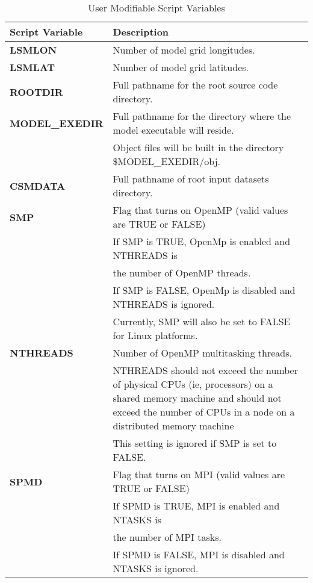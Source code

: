 \bigskip
\begin{longtable}{|p{1.5in}|p{4.5in}|}
\caption{\label{table_env_vars} User Modifiable Script Variables} \\
\hline
\endhead
\hline
{\bf Script Variable} & {\bf Description}  \\ \hline \hline
{\bf LSMLON}         &   Number of model grid longitudes. \\ \hline
{\bf LSMLAT}         &   Number of model grid latitudes. \\ \hline
{\bf ROOTDIR}        &   Full pathname for the root source code directory. \\ \hline
{\bf MODEL\_EXEDIR}  &   Full pathname for the directory where the model executable will reside. \\
                     &   Object files will be built in the directory \$MODEL\_EXEDIR/obj. \\ 
{\bf CSMDATA}        &   Full pathname of root input datasets directory. \\ \hline
{\bf SMP}            &   Flag that turns on OpenMP (valid values are TRUE or FALSE) \\
                     &   If SMP is TRUE, OpenMp is enabled and NTHREADS is \\
                     &   the number of OpenMP threads. \\
                     &   If SMP is FALSE, OpenMp is disabled and NTHREADS is ignored. \\ 
                     &   Currently, SMP will also be set to FALSE for Linux platforms. \\ \hline
{\bf NTHREADS}       &   Number of OpenMP multitasking threads. \\
	             &   NTHREADS should not exceed the number of physical CPUs (ie, processors) 
	                 on a shared memory machine and should not exceed the number of CPUs 
                         in a node on a distributed memory machine \\
                     &   This setting is ignored if SMP is set to FALSE. \\ \hline
{\bf SPMD}           &   Flag that turns on MPI (valid values are TRUE or FALSE) \\
                     &   If SPMD is TRUE, MPI is enabled and NTASKS is \\
                     &   the number of MPI tasks. \\
                     &   If SPMD is FALSE, MPI is disabled and NTASKS is ignored. \\ \hline

\end{longtable}
